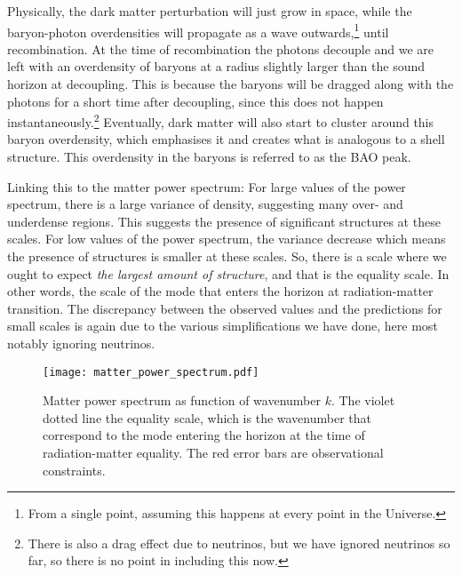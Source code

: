         Physically, the dark matter perturbation will just grow in space, while the baryon-photon overdensities will propagate as a wave outwards,\footnote{From a single point, assuming this happens at every point in the Universe.} until recombination. At the time of recombination the photons decouple and we are left with an overdensity of baryons at a radius slightly larger than the sound horizon at decoupling. This is because the baryons will be dragged along with the photons for a short time after decoupling, since this does not happen instantaneously.\footnote{There is also a drag effect due to neutrinos, but we have ignored neutrinos so far, so there is no point in including this now.} Eventually, dark matter will also start to cluster around this baryon overdensity, which emphasises it and creates what is analogous to a shell structure. This overdensity in the baryons is referred to as the BAO peak. 

        Linking this to the matter power spectrum: For large values of the power spectrum, there is a large variance of density, suggesting many over- and underdense regions. This suggests the presence of significant structures at these scales. For low values of the power spectrum, the variance decrease which means the presence of structures is smaller at these scales. So, there is a scale where we ought to expect \textit{the largest amount of structure}, and that is the equality scale. In other words, the scale of the mode that enters the horizon at radiation-matter transition. The discrepancy between the observed values and the predictions for small scales is again due to the various simplifications we have done, here most notably ignoring neutrinos.
    \begin{figure}
        \texttt{[image: matter\_power\_spectrum.pdf]}
        \caption{Matter power spectrum as function of wavenumber $k$. The violet dotted line the equality scale, which is the wavenumber that correspond to the mode entering the horizon at the time of radiation-matter equality. The red error bars are observational constraints.}
        \label{fig:m4:matter_power_spectrum}
    \end{figure}